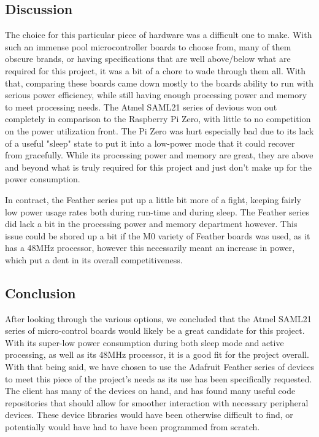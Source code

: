 \documentclass[onecolumn, draftclsnofoot,10pt, compsoc]{IEEEtran}
\begin{document}
    \subsection{Discussion}
    The choice for this particular piece of hardware was a difficult one to make.
    With such an immense pool microcontroller boards to choose from, many of them obscure brands, or having specifications that are well above/below what are required for this project, it was a bit of a chore to wade through them all.
    With that, comparing these boards came down mostly to the boards ability to run with serious power efficiency, while still having enough processing power and memory to meet processing needs.
    The Atmel SAML21 series of devious won out completely in comparison to the Raspberry Pi Zero, with little to no competition on the power utilization front.
    The Pi Zero was hurt especially bad due to its lack of a useful "sleep" state to put it into a low-power mode that it could recover from gracefully.
    While its processing power and memory are great, they are above and beyond what is truly required for this project and just don't make up for the power consumption.\par
    In contract, the Feather series put up a little bit more of a fight, keeping fairly low power usage rates both during run-time and during sleep.
    The Feather series did lack a bit in the processing power and memory department however.
    This issue could be shored up a bit if the M0 variety of Feather boards was used, as it has a 48MHz processor, however this necessarily meant an increase in power, which put a dent in its overall competitiveness.   
    
    \subsection{Conclusion}
    After looking through the various options, we concluded that the Atmel SAML21 series of micro-control boards would likely be a great candidate for this project. With its super-low power consumption during both sleep mode and active processing, as well as its 48MHz processor, it is a good fit for the project overall.
    With that being said, we have chosen to use the Adafruit Feather series of devices to meet this piece of the project's needs as its use has been specifically requested. The client has many of the devices on hand, and has found many useful code repositories that should allow for smoother interaction with necessary peripheral devices. These device libraries would have been otherwise difficult to find, or potentially would have had to have been programmed from scratch.
    
\end{document}
